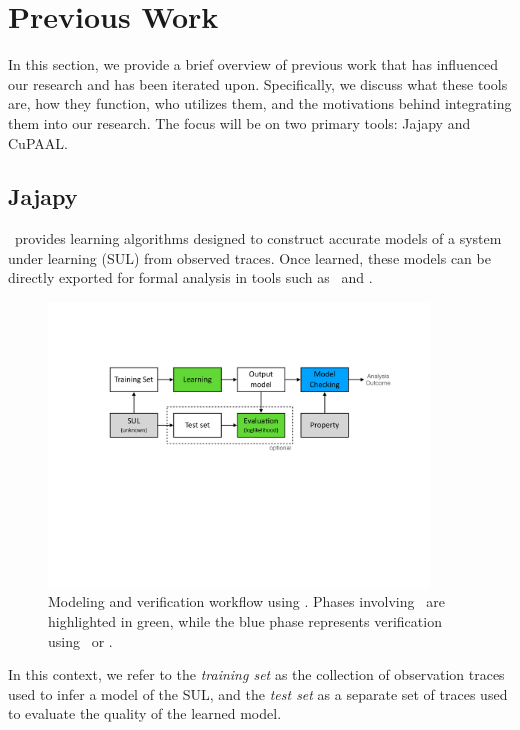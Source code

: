 \section{Previous Work}\label{sec:jajapy_and_cupaal}
In this section, we provide a brief overview of previous work that has influenced our research and has been iterated upon.
Specifically, we discuss what these tools are, how they function, who utilizes them, and the motivations behind integrating them into our research.
The focus will be on two primary tools: Jajapy and CuPAAL.


\subsection{Jajapy}\label{sec:jajapy}
\Jajapy\ provides learning algorithms designed to construct accurate models of a system under learning (SUL) from observed traces.
Once learned, these models can be directly exported for formal analysis in tools such as \Storm~and \Prism.

\begin{figure}[!htb]
    \centering
    \includegraphics[width=0.9\textwidth]{figures/workflow.pdf}
    \caption{Modeling and verification workflow using \Jajapy. Phases involving \Jajapy\ are highlighted in green, while the blue phase represents verification using \Storm~or \Prism.}
    \label{fig:workflow}
\end{figure}

In this context, we refer to the \textit{training set} as the collection of observation traces used to infer a model of the SUL, and the \textit{test set} as a separate set of traces used to evaluate the quality of the learned model.

